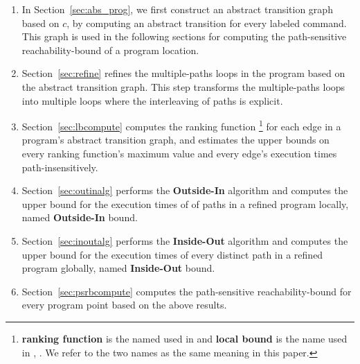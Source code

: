 \begin{enumerate}
\item  In Section~\ref{sec:abs_prog}, we first construct an abstract transition graph based on $c$, by computing an abstract transition 
for every labeled command. 
This graph is used in the following sections
for computing the path-sensitive reachability-bound of a program location.
\item Section~\ref{sec:refine}
refines the multiple-paths loops in the program
based on the abstract transition graph.
This step transforms the multiple-paths loops into multiple loops where
the interleaving of paths is explicit.
\item Section~\ref{sec:lbcompute} computes the ranking function  
\footnote{\textbf{ranking function} is the named used in \cite{SinnZV14}
and \textbf{local bound} is the name used in \cite{ZulegerGSV11}, \cite{sinn2017complexity}.
We refer to the two names as the same meaning in this paper.} for each edge in a program's abstract transition graph,
and estimates the upper bounds on every ranking function's maximum value and every edge's execution times path-insensitively.
\item Section~\ref{sec:outinalg} performs the \textbf{Outside-In} algorithm and computes
the upper bound for the execution times of  of paths in a refined program locally, named \textbf{Outside-In} bound.
\item Section~\ref{sec:inoutalg} performs the \textbf{Inside-Out} algorithm and 
computes the upper bound for the execution times of
every distinct path in a refined program globally, named \textbf{Inside-Out} bound.
\item Section~\ref{sec:psrbcompute} computes the path-sensitive reachability-bound for every program point
based on the above results.
\end{enumerate}

